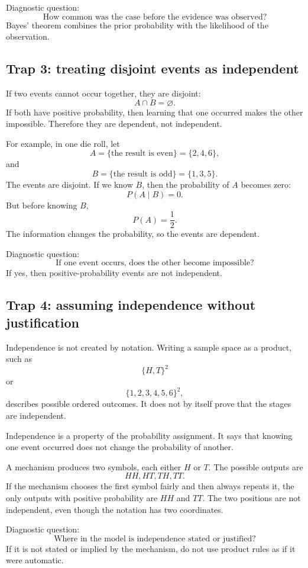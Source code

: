 Diagnostic question:
\[
\text{How common was the case before the evidence was observed?}
\]
Bayes' theorem combines the prior probability with the likelihood of the
observation.

\subsection*{Trap 3: treating disjoint events as independent}

If two events cannot occur together, they are disjoint:
\[
A\cap B=\varnothing.
\]
If both have positive probability, then learning that one occurred makes the
other impossible. Therefore they are dependent, not independent.

For example, in one die roll, let
\[
A=\{\text{the result is even}\}=\{2,4,6\},
\]
and
\[
B=\{\text{the result is odd}\}=\{1,3,5\}.
\]
The events are disjoint. If we know \(B\), then the probability of \(A\) becomes
zero:
\[
P(A\mid B)=0.
\]
But before knowing \(B\),
\[
P(A)=\frac12.
\]
The information changes the probability, so the events are dependent.

Diagnostic question:
\[
\text{If one event occurs, does the other become impossible?}
\]
If yes, then positive-probability events are not independent.

\subsection*{Trap 4: assuming independence without justification}

Independence is not created by notation. Writing a sample space as a product,
such as
\[
\{H,T\}^2
\]
or
\[
\{1,2,3,4,5,6\}^2,
\]
describes possible ordered outcomes. It does not by itself prove that the stages
are independent.

Independence is a property of the probability assignment. It says that knowing
one event occurred does not change the probability of another.

\begin{examplebox}
A mechanism produces two symbols, each either \(H\) or \(T\). The possible
outputs are
\[
HH,HT,TH,TT.
\]
If the mechanism chooses the first symbol fairly and then always repeats it, the
only outputs with positive probability are \(HH\) and \(TT\). The two positions
are not independent, even though the notation has two coordinates.
\end{examplebox}

Diagnostic question:
\[
\text{Where in the model is independence stated or justified?}
\]
If it is not stated or implied by the mechanism, do not use product rules as if
it were automatic.

